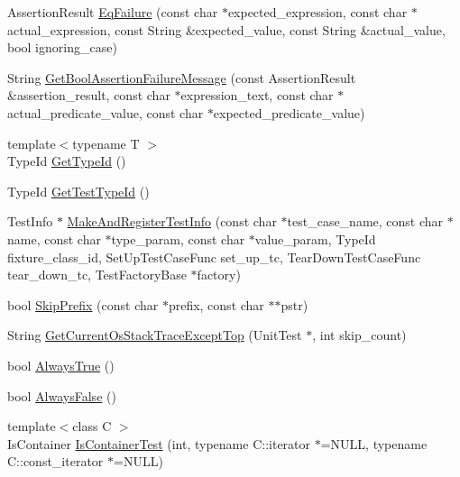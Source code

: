 \begin{DoxyCompactItemize}
\item 
\-Assertion\-Result \hyperlink{namespacetesting_1_1internal_a1b32471fa3a4994b5e41120a349162ca}{\-Eq\-Failure} (const char $\ast$expected\-\_\-expression, const char $\ast$actual\-\_\-expression, const \-String \&expected\-\_\-value, const \-String \&actual\-\_\-value, bool ignoring\-\_\-case)
\item 
\-String \hyperlink{namespacetesting_1_1internal_ab5e2ffddf04d86a4faa0253b8e1fe67e}{\-Get\-Bool\-Assertion\-Failure\-Message} (const \-Assertion\-Result \&assertion\-\_\-result, const char $\ast$expression\-\_\-text, const char $\ast$actual\-\_\-predicate\-\_\-value, const char $\ast$expected\-\_\-predicate\-\_\-value)
\item 
{\footnotesize template$<$typename T $>$ }\\\-Type\-Id \hyperlink{namespacetesting_1_1internal_a355043c4b5e1fa83312afadc5c975c8f}{\-Get\-Type\-Id} ()
\item 
\-Type\-Id \hyperlink{namespacetesting_1_1internal_a3e7f71e983859c908bae4ec8d593ff58}{\-Get\-Test\-Type\-Id} ()
\item 
\-Test\-Info $\ast$ \hyperlink{namespacetesting_1_1internal_a8f58f081cff056a35d18746667a16c4f}{\-Make\-And\-Register\-Test\-Info} (const char $\ast$test\-\_\-case\-\_\-name, const char $\ast$name, const char $\ast$type\-\_\-param, const char $\ast$value\-\_\-param, \-Type\-Id fixture\-\_\-class\-\_\-id, \-Set\-Up\-Test\-Case\-Func set\-\_\-up\-\_\-tc, \-Tear\-Down\-Test\-Case\-Func tear\-\_\-down\-\_\-tc, \-Test\-Factory\-Base $\ast$factory)
\item 
bool \hyperlink{namespacetesting_1_1internal_ac490e9b0963689436d4c483653b3f93f}{\-Skip\-Prefix} (const char $\ast$prefix, const char $\ast$$\ast$pstr)
\item 
\-String \hyperlink{namespacetesting_1_1internal_aa233c580f5aa0ac5abf54608bc3366bc}{\-Get\-Current\-Os\-Stack\-Trace\-Except\-Top} (\-Unit\-Test $\ast$, int skip\-\_\-count)
\item 
bool \hyperlink{namespacetesting_1_1internal_a7b125f3952e08530aedb98a650ee73c1}{\-Always\-True} ()
\item 
bool \hyperlink{namespacetesting_1_1internal_ab8a8bf58ff82fd6e6989ff30d9a17932}{\-Always\-False} ()
\item 
{\footnotesize template$<$class C $>$ }\\\-Is\-Container \hyperlink{namespacetesting_1_1internal_ad4dc59754643e723ba56e09275fb9eff}{\-Is\-Container\-Test} (int, typename \-C\-::iterator $\ast$=\-N\-U\-L\-L, typename \-C\-::const\-\_\-iterator $\ast$=\-N\-U\-L\-L)
$$
\end{DoxyCompactItemize}
